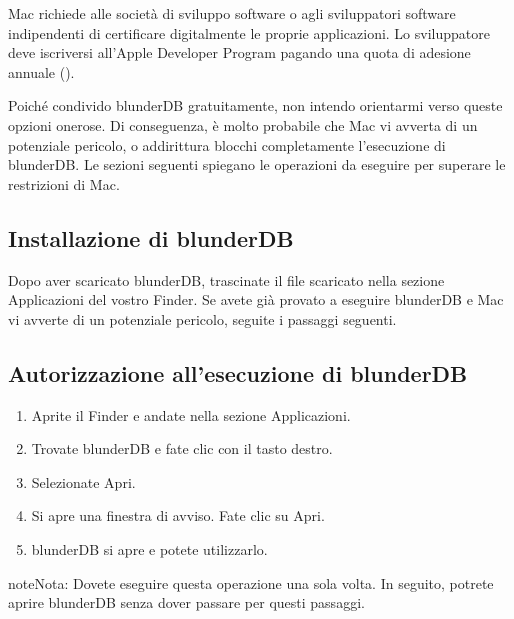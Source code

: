 \documentclass[letterpaper,10pt,italian]{sphinxmanual}
\begin{document}
\sphinxAtStartPar
Mac richiede alle società di sviluppo software o agli sviluppatori software indipendenti di certificare digitalmente le proprie applicazioni. Lo sviluppatore deve iscriversi all’Apple Developer Program pagando una quota di adesione annuale ().

\sphinxAtStartPar
Poiché condivido blunderDB gratuitamente, non intendo orientarmi verso queste opzioni onerose. Di conseguenza, è molto probabile che Mac vi avverta di un potenziale pericolo, o addirittura blocchi completamente l’esecuzione di blunderDB. Le sezioni seguenti spiegano le operazioni da eseguire per superare le restrizioni di Mac.


\subsection{Installazione di blunderDB}
\label{\detokenize{annexe_mac_securite:installation-de-blunderdb}}
\sphinxAtStartPar
Dopo aver scaricato blunderDB, trascinate il file scaricato nella sezione Applicazioni del vostro Finder. Se avete già provato a eseguire blunderDB e Mac vi avverte di un potenziale pericolo, seguite i passaggi seguenti.


\subsection{Autorizzazione all’esecuzione di blunderDB}
\label{\detokenize{annexe_mac_securite:autorisation-de-l-execution-de-blunderdb}}\begin{enumerate}
%
\item {} 
\sphinxAtStartPar
Aprite il Finder e andate nella sezione Applicazioni.

\item {} 
\sphinxAtStartPar
Trovate blunderDB e fate clic con il tasto destro.

\item {} 
\sphinxAtStartPar
Selezionate Apri.

\item {} 
\sphinxAtStartPar
Si apre una finestra di avviso. Fate clic su Apri.

\item {} 
\sphinxAtStartPar
blunderDB si apre e potete utilizzarlo.

\end{enumerate}

\begin{sphinxadmonition}{note}{Nota:}
\sphinxAtStartPar
Dovete eseguire questa operazione una sola volta. In seguito, potrete aprire blunderDB senza dover passare per questi passaggi.
\end{sphinxadmonition}
\end{document}
